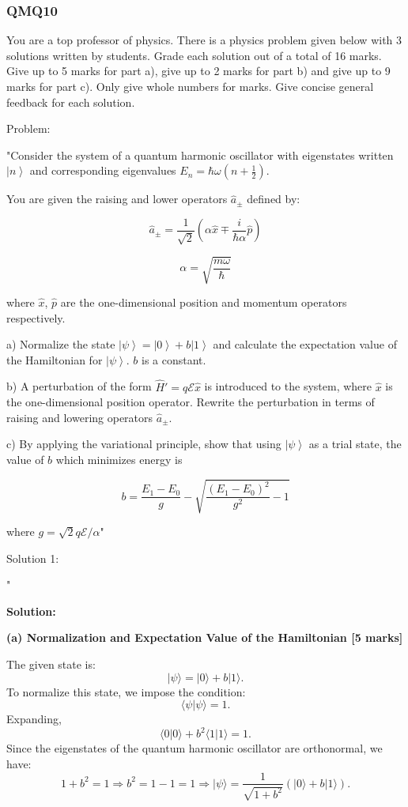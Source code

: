 \subsubsection{QMQ10}

You are a top professor of physics. There is a physics problem given below with 3 solutions written by students. Grade each solution out of a total of 16 marks. Give up to 5 marks for part a), give up to 2 marks for part b) and give up to 9 marks for part c). Only give whole numbers for marks. Give concise general feedback for each solution.

Problem:

"Consider the system of a quantum harmonic oscillator with eigenstates written \( \left| n \right> \) and corresponding eigenvalues \( E_{n} = \hbar\omega(n+\frac{1}{2}) \).

You are given the raising and lower operators \( \hat{a}_{\pm} \) defined by:

\[ \hat{a}_{\pm} = \frac{1}{\sqrt{2}}(\alpha \hat{x} \mp \frac{i}{\hbar\alpha} \hat{p}) \]

\[ \alpha = \sqrt{\frac{m\omega}{\hbar}} \]

where \( \hat{x} \), \( \hat{p} \) are the one-dimensional position and momentum operators respectively.

a) Normalize the state \( \left| \psi \right> =  \left| 0 \right> + b \left| 1 \right> \) and calculate the expectation value of the Hamiltonian for \( \left| \psi \right> \). \( b \) is a constant.

b) A perturbation of the form \( \hat{H}' = q \mathcal{E} \hat{x} \) is introduced to the system, where \( \hat{x} \) is the one-dimensional position operator. Rewrite the perturbation in terms of raising and lowering operators \( \hat{a}_{\pm} \).

c) By applying the variational principle, show that using \( \left| \psi \right> \) as a trial state, the value of \( b \) which minimizes energy is 

\[ b = \frac{E_{1} - E_{0}}{g} - \sqrt{\frac{(E_{1} - E_{0})^{2}}{g^{2}} -1} \]

where \( g = \sqrt{2} q \mathcal{E} / {\alpha} \)"

Solution 1: 

"

\noindent \textbf{Solution:}

\textbf{(a) Normalization and Expectation Value of the Hamiltonian [5 marks]}

The given state is:
\[
\vert \psi \rangle = \vert 0 \rangle + b \vert 1 \rangle.
\]
To normalize this state, we impose the condition:
\[
\langle \psi \vert \psi \rangle = 1.
\]
Expanding,
\[
\langle 0 \vert 0 \rangle + b^2 \langle 1 \vert 1 \rangle = 1.
\]
Since the eigenstates of the quantum harmonic oscillator are orthonormal, we have:
\[
1 + b^2 = 1 \Rightarrow b^2 = 1 - 1 = 1 \Rightarrow \vert \psi \rangle = \frac{1}{\sqrt{1 + b^2}} (\vert 0 \rangle + b \vert 1 \rangle).
\]

